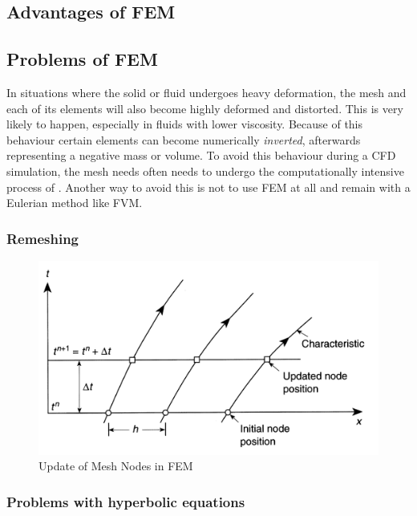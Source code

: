 
\subsection{Advantages of FEM}
\label{sec:adv_of_fem}


\subsection{Problems of FEM}
\label{sec:prob_of_fem}
In situations where the solid or fluid undergoes heavy deformation, the mesh and each of its elements will also become highly deformed and distorted. This is very likely to happen, especially in fluids with lower viscosity. Because of this behaviour certain elements can become numerically \emph{inverted}, afterwards representing a negative mass or volume. To avoid this behaviour during a CFD simulation, the mesh needs often needs to undergo the computationally intensive process of . Another way to avoid this is not to use FEM at all and remain with a Eulerian method like FVM. 

\subsubsection{Remeshing}
\label{sec:remeshing_fem}
\begin{figure}[htp]
\centering
\includegraphics[scale=0.50]{Figures/fem_meshupdate_zienk_53.png}
\caption{Update of Mesh Nodes in FEM}
\label{fig:MeshUpdateFEM}
\end{figure}

\subsubsection{Problems with hyperbolic equations}

